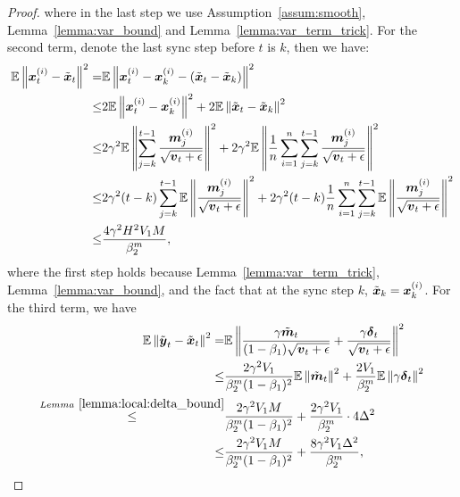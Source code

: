 \begin{proof}
where in the last step we use Assumption~\ref{assum:smooth}, Lemma~\ref{lemma:var_bound} and Lemma~\ref{lemma:var_term_trick}.
For the second term, denote the last sync step before $t$ is $k$, then we have:
\begin{equation}
\label{equa:lemma:local:mom_step:consensus}
\begin{aligned}
    \mathbb{E}\left\| \boldsymbol{x}_t^{(i)} - \tilde{\boldsymbol{x}}_t \right\|^2 = & \mathbb{E}\left\| \boldsymbol{x}_t^{(i)} - \boldsymbol{x}_k^{(i)} - ( \tilde{\boldsymbol{x}}_t - \tilde{\boldsymbol{x}}_k) \right\|^2 \\
\leq & 2\mathbb{E}\left\| \boldsymbol{x}_t^{(i)} - \boldsymbol{x}_k^{(i)}  \right\|^2 + 2\mathbb{E}\left\| \tilde{\boldsymbol{x}}_t - \tilde{\boldsymbol{x}}_k \right\|^2 \\
    \leq & 2\gamma^2\mathbb{E}\left\| \sum_{j=k}^{t-1} \frac{\boldsymbol{m}_j^{(i)}}{\sqrt{\boldsymbol{v}_t+\epsilon}} \right\|^2 + 2\gamma^2\mathbb{E}\left\| \frac{1}{n}\sum_{i=1}^{n}\sum_{j=k}^{t-1} \frac{\boldsymbol{m}_j^{(i)}}{\sqrt{\boldsymbol{v}_t+\epsilon}} \right\|^2 \\
\leq & 2\gamma^2(t-k)\sum_{j=k}^{t-1}\mathbb{E}\left\| \frac{\boldsymbol{m}_j^{(i)}}{\sqrt{\boldsymbol{v}_t+\epsilon}} \right\|^2 + 2\gamma^2(t-k)\frac{1}{n}\sum_{i=1}^{n}\sum_{j=k}^{t-1}\mathbb{E}\left\| \frac{\boldsymbol{m}_j^{(i)}}{\sqrt{\boldsymbol{v}_t+\epsilon}} \right\|^2 \\
    \leq & \frac{4\gamma^2H^2V_1M}{\beta_2^m},
\end{aligned}
\end{equation}
where the first step holds because Lemma~\ref{lemma:var_term_trick}, Lemma~\ref{lemma:var_bound}, and the fact that at the sync step $k$, $\tilde{\boldsymbol{x}}_k = \boldsymbol{x}_k^{(i)}$. For the third term, we have
\begin{equation}
\label{equa:lemma:local:mom_step:y-x}
\begin{aligned}
    \mathbb{E}\left\| \tilde{\boldsymbol{y}}_t - \tilde{\boldsymbol{x}}_t \right\|^2 = & \mathbb{E}\left\| \frac{\gamma\tilde{\boldsymbol{m}}_t}{(1-\beta_1)\sqrt{\boldsymbol{v}_{t}+\epsilon}} + \frac{\gamma\boldsymbol{\delta}_{t}}{\sqrt{\boldsymbol{v}_{t}+\epsilon}} \right\|^2 \\
\leq & \frac{2\gamma^2V_1}{\beta_2^m(1-\beta_1)^2}\mathbb{E}\left\| \tilde{\boldsymbol{m}}_t \right\|^2 + \frac{2V_1}{\beta_2^m}\mathbb{E}\left\| \gamma\boldsymbol{\delta}_{t} \right\|^2 \\
    \overset{Lemma~\ref{lemma:local:delta_bound}}{\leq} & \frac{2\gamma^2V_1M}{\beta_2^m(1-\beta_1)^2} + \frac{2\gamma^2V_1}{\beta_2^m}\cdot 4\Delta^2 \\
\leq & \frac{2\gamma^2V_1M}{\beta_2^m(1-\beta_1)^2} + \frac{8\gamma^2V_1\Delta^2}{\beta_2^m},
\end{aligned}
\end{equation}

\end{proof}
